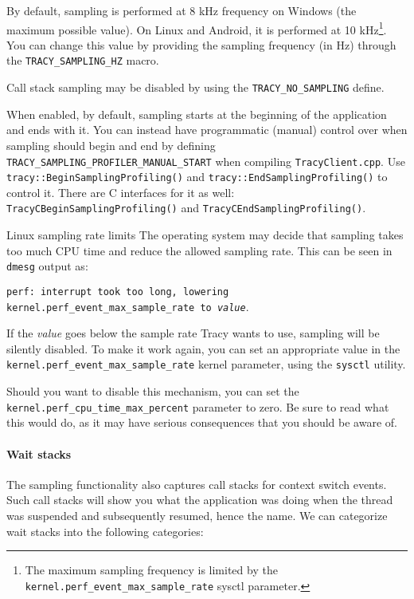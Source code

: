 \documentclass[hidelinks,titlepage,a4paper,twoside]{article}
\begin{document}
By default, sampling is performed at 8 kHz frequency on Windows (the maximum possible value). On Linux and Android, it is performed at 10 kHz\footnote{The maximum sampling frequency is limited by the \texttt{kernel.perf\_event\_max\_sample\_rate} sysctl parameter.}. You can change this value by providing the sampling frequency (in Hz) through the \texttt{TRACY\_SAMPLING\_HZ} macro.

Call stack sampling may be disabled by using the \texttt{TRACY\_NO\_SAMPLING} define.

When enabled, by default, sampling starts at the beginning of the application and ends with it. You can instead have programmatic (manual) control over when sampling should begin and end by defining \texttt{TRACY\_SAMPLING\_PROFILER\_MANUAL\_START} when compiling \texttt{TracyClient.cpp}. Use \texttt{tracy::BeginSamplingProfiling()} and \texttt{tracy::EndSamplingProfiling()} to control it. There are C interfaces for it as well: \texttt{TracyCBeginSamplingProfiling()} and \texttt{TracyCEndSamplingProfiling()}.

\begin{bclogo}[
noborder=true,
couleur=black!5,
logo=\bcbombe
]{Linux sampling rate limits}
The operating system may decide that sampling takes too much CPU time and reduce the allowed sampling rate. This can be seen in \texttt{dmesg} output as:

\texttt{perf: interrupt took too long, lowering kernel.perf\_event\_max\_sample\_rate to \emph{value}}.

If the \emph{value} goes below the sample rate Tracy wants to use, sampling will be silently disabled. To make it work again, you can set an appropriate value in the \texttt{kernel.perf\_event\_max\_sample\_rate} kernel parameter, using the \texttt{sysctl} utility.

Should you want to disable this mechanism, you can set the \texttt{kernel.perf\_cpu\_time\_max\_percent} parameter to zero. Be sure to read what this would do, as it may have serious consequences that you should be aware of.
\end{bclogo}

\paragraph{Wait stacks}
\label{waitstacks}

The sampling functionality also captures call stacks for context switch events. Such call stacks will show you what the application was doing when the thread was suspended and subsequently resumed, hence the name. We can categorize wait stacks into the following categories:
\end{document}
